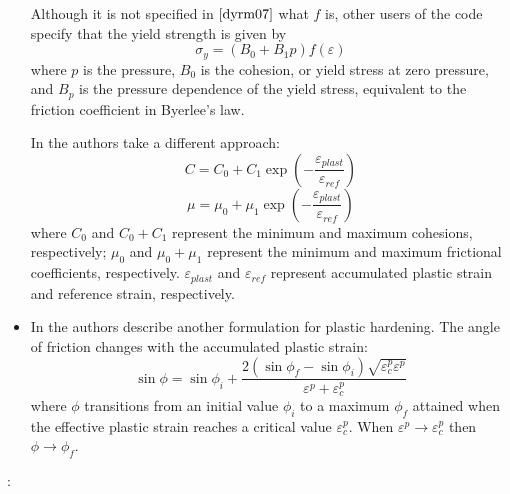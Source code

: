 \begin{itemize}
Although it is not specified in $\cite{dyrm07}$ what $f$ is, other users of the code 
specify that the yield strength is given by 
\[
\sigma_y = (B_0 + B_1 p ) f(\varepsilon)
\]
where $p$ is the pressure, $B_0$ is the cohesion, or yield stress at
zero pressure, and $B_p$ is the pressure dependence of the yield
stress, equivalent to the friction coefficient in Byerlee’s law. 

In \cite{yamz18} the authors take a different approach:
\[
C=C_0+C_1 \exp \left( -\frac{\varepsilon_{plast}}{\varepsilon_{ref}} \right)
\]
\[
\mu=\mu_0+\mu_1 \exp \left( -\frac{\varepsilon_{plast}}{\varepsilon_{ref}} \right)
\]
where $C_0$ and $C_0+C_1$ represent the minimum and maximum cohesions, respectively;
$\mu_0$ and $\mu_0+\mu_1$ represent the minimum and maximum frictional coefficients, respectively. 
$\varepsilon_{plast}$ and $\varepsilon_{ref}$ represent accumulated plastic strain and 
reference strain, respectively.

\item In \cite{leor89} the authors describe another formulation for plastic hardening. The angle of friction 
changes with the accumulated plastic strain:
\[
\sin \phi = \sin \phi_i  + \frac{2(\sin \phi_f - \sin\phi_i)\sqrt{\varepsilon^p_c  \varepsilon^p }}{\varepsilon^p + \varepsilon^p_c}
\] 
where $\phi$ transitions from an initial value $\phi_i$ to a maximum $\phi_f$ attained when the effective
plastic strain reaches a critical value $\varepsilon_c^p$. When $\varepsilon^p \rightarrow \varepsilon^p_c$
then $\phi \rightarrow \phi_f$.

\end{itemize}


\Literature: \cite{ster99,nigo15}
